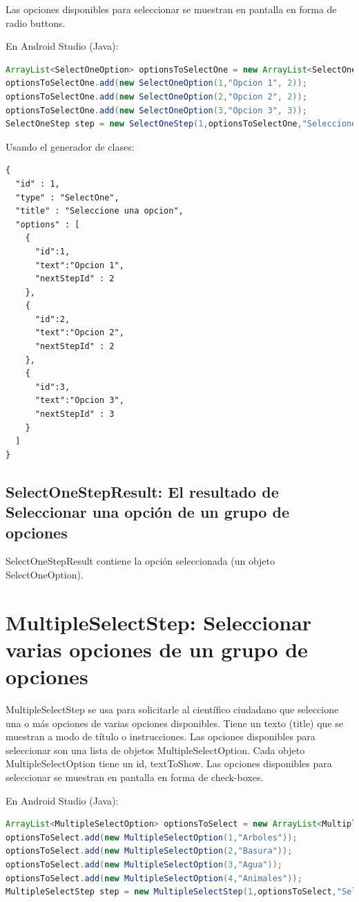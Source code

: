 Las opciones disponibles para seleccionar se muestran en pantalla en forma de radio buttons.

En Android Studio (Java):
\begin{lstlisting}[language=Java, frame=tlb]	
ArrayList<SelectOneOption> optionsToSelectOne = new ArrayList<SelectOneOption>();
optionsToSelectOne.add(new SelectOneOption(1,"Opcion 1", 2));
optionsToSelectOne.add(new SelectOneOption(2,"Opcion 2", 2));
optionsToSelectOne.add(new SelectOneOption(3,"Opcion 3", 3));
SelectOneStep step = new SelectOneStep(1,optionsToSelectOne,"Seleccione una opcion");

\end{lstlisting}

Usando el generador de clases:
\begin{lstlisting}[language=XML, frame=tlb]	
{
  "id" : 1,
  "type" : "SelectOne",
  "title" : "Seleccione una opcion",
  "options" : [
    {
      "id":1,
      "text":"Opcion 1",
      "nextStepId" : 2
    },
    {
      "id":2,
      "text":"Opcion 2",
      "nextStepId" : 2
    },
    {
      "id":3,
      "text":"Opcion 3",
      "nextStepId" : 3
    }
  ]
}
\end{lstlisting}

\subsection{SelectOneStepResult: El resultado de Seleccionar una opción de un grupo de opciones}
SelectOneStepResult contiene la opción seleccionada (un objeto SelectOneOption).

\section{MultipleSelectStep: Seleccionar varias opciones de un grupo de opciones}
MultipleSelectStep  se usa para solicitarle al científico ciudadano que seleccione una o más opciones de varias opciones disponibles. Tiene un texto (title) que se muestran a modo de título o instrucciones. Las opciones disponibles para seleccionar son una lista de objetos MultipleSelectOption.
Cada objeto MultipleSelectOption tiene un id, textToShow.
Las opciones disponibles para seleccionar se muestran en pantalla en forma de check-boxes.


En Android Studio (Java):
\begin{lstlisting}[language=Java, frame=tlb]	
ArrayList<MultipleSelectOption> optionsToSelect = new ArrayList<MultipleSelectOption>();
optionsToSelect.add(new MultipleSelectOption(1,"Arboles"));
optionsToSelect.add(new MultipleSelectOption(2,"Basura"));
optionsToSelect.add(new MultipleSelectOption(3,"Agua"));
optionsToSelect.add(new MultipleSelectOption(4,"Animales"));
MultipleSelectStep step = new MultipleSelectStep(1,optionsToSelect,"Seleccione lo que ve",2); 
\end{lstlisting}

